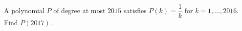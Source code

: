 A polynomial $P$ of degree at most $2015$ satisfies $P(k)=\dfrac{1}{k}$ for $k=1,\ldots,2016$. Find $P(2017)$.
